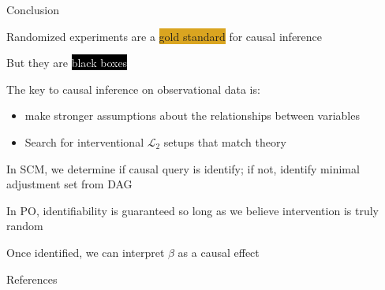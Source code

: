 \documentclass[notes,11pt, aspectratio=169, usenames, dvipsnames]{beamer}
\newenvironment{wideitemize}{\itemize\addtolength{\itemsep}{10pt}}{\enditemize}
\begin{document}
\begin{frame}{Conclusion}
	\begin{wideitemize}
		\item Randomized experiments are a \colorbox{Goldenrod}{gold standard} for causal inference
		\item But they are \colorbox{Black}{\textcolor{White}{black boxes}}
		
		\item The key to causal inference on observational data is:
		\begin{itemize}
			\item make stronger assumptions about the relationships between variables 
			\item Search for interventional $\mathcal{L}_2$ setups that match theory 
		\end{itemize}
		\item In SCM, we determine if causal query is identify; if not, identify minimal adjustment set from DAG
		\item In PO, identifiability is guaranteed so long as we believe intervention is truly random
		\item Once identified, we can interpret $\beta$ as a causal effect 
	\end{wideitemize}
\end{frame}

\begin{frame}[allowframebreaks]{References}
	\printbibliography
\end{frame}



\end{document}
